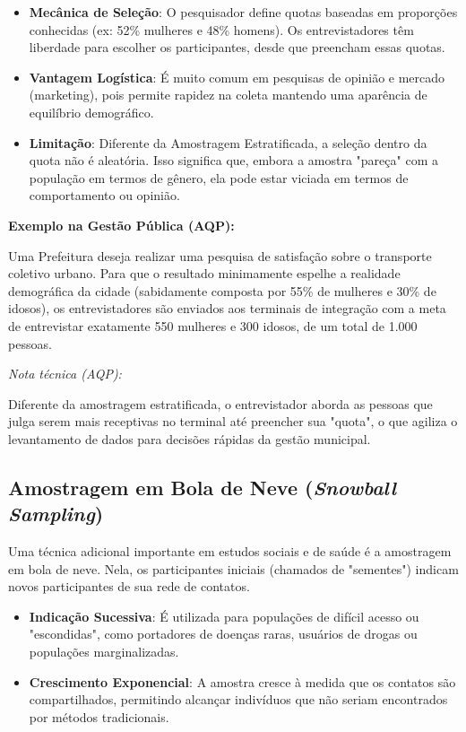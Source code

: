 \begin{itemize}
    \item \textbf{Mecânica de Seleção}: O pesquisador define quotas baseadas em proporções conhecidas (ex: 52\% mulheres e 48\% homens). Os entrevistadores têm liberdade para escolher os participantes, desde que preencham essas quotas.
    \item \textbf{Vantagem Logística}: É muito comum em pesquisas de opinião e mercado (marketing), pois permite rapidez na coleta mantendo uma aparência de equilíbrio demográfico.
    \item \textbf{Limitação}: Diferente da Amostragem Estratificada, a seleção dentro da quota não é aleatória. Isso significa que, embora a amostra "pareça" com a população em termos de gênero, ela pode estar viciada em termos de comportamento ou opinião.
\end{itemize}


\textbf{Exemplo na Gestão Pública (AQP):} \vskip0.3cm

Uma Prefeitura deseja realizar uma pesquisa de satisfação sobre o transporte coletivo urbano. Para que o resultado minimamente espelhe a realidade demográfica da cidade (sabidamente composta por 55\% de mulheres e 30\% de idosos), os entrevistadores são enviados aos terminais de integração com a meta de entrevistar exatamente 550 mulheres e 300 idosos, de um total de 1.000 pessoas. \vskip0.3cm

\textit{Nota técnica (AQP):} \vskip0.3cm

Diferente da amostragem estratificada, o entrevistador aborda as pessoas que julga serem mais receptivas no terminal até preencher sua "quota", o que agiliza o levantamento de dados para decisões rápidas da gestão municipal.

\subsection{Amostragem em Bola de Neve (\textit{Snowball Sampling})}

Uma técnica adicional importante em estudos sociais e de saúde é a amostragem em bola de neve. Nela, os participantes iniciais (chamados de "sementes") indicam novos participantes de sua rede de contatos.

\begin{itemize}
    \item \textbf{Indicação Sucessiva}: É utilizada para populações de difícil acesso ou "escondidas", como portadores de doenças raras, usuários de drogas ou populações marginalizadas.
    \item \textbf{Crescimento Exponencial}: A amostra cresce à medida que os contatos são compartilhados, permitindo alcançar indivíduos que não seriam encontrados por métodos tradicionais.
\end{itemize}




